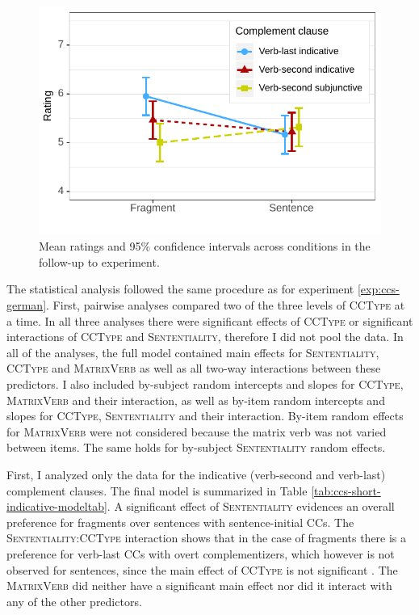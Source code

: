 \begin{figure}[t]
\includegraphics[scale=1]{figures/ex2b_ccs_de_sc_estimates}
 \caption{Mean ratings and 95\% confidence intervals across conditions in the follow-up to experiment. \label{fig:ccs-german-short-estimates}}
\end{figure}

The statistical analysis followed the same procedure as for experiment \ref{exp:ccs-german}. First, pairwise analyses compared two of the three levels of \textsc{CCType} at a time. In all three analyses there were significant effects of \textsc{CCType} or significant interactions of \textsc{CCType} and \textsc{Sententiality}, therefore I did not pool the data. In all of the analyses, the full model contained main effects for \textsc{Sententiality}, \textsc{CCType} and \textsc{MatrixVerb} as well as all two-way interactions between these predictors. I also included by-subject random intercepts and slopes for \textsc{CCType}, \textsc{MatrixVerb} and their interaction, as well as by-item random intercepts and slopes for \textsc{CCType}, \textsc{Sententiality} and their interaction. By-item random effects for \textsc{MatrixVerb} were not considered because the matrix verb was not varied between items. The same holds for by-subject \textsc{Sententiality} random effects.\largerpage

First, I analyzed only the data for the indicative (verb-second and verb-last) complement clauses. The final model is summarized in Table \ref{tab:ccs-short-indicative-modeltab}. A significant effect of \textsc{Sententiality}  evidences an overall preference for fragments over sentences with sentence-initial CCs. The \textsc{Sententiality:CCType} interaction  shows that in the case of fragments there is a preference for verb-last CCs with overt complementizers, which however is not observed for sentences, since the main effect of \textsc{CCType} is not significant . The \textsc{MatrixVerb} did neither have a significant main effect nor did it interact with any of the other predictors.

